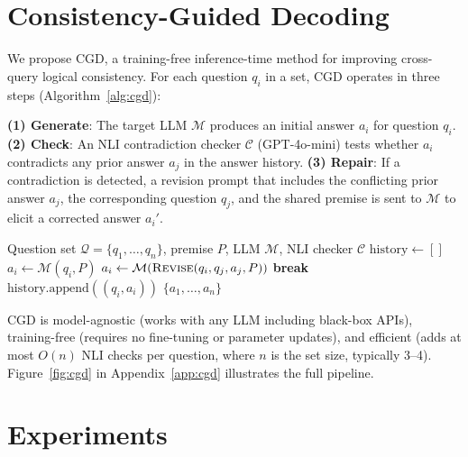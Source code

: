 \documentclass{article}
\newcommand{\method}{\textsc{CGD}}
\begin{document}
\section{Consistency-Guided Decoding}
\label{sec:method}

We propose \method{}, a training-free inference-time method for improving cross-query logical consistency. For each question $q_i$ in a set, \method{} operates in three steps (Algorithm~\ref{alg:cgd}):

\textbf{(1) Generate}: The target LLM $\mathcal{M}$ produces an initial answer $a_i$ for question $q_i$.
\textbf{(2) Check}: An NLI contradiction checker $\mathcal{C}$ (GPT-4o-mini) tests whether $a_i$ contradicts any prior answer $a_j$ in the answer history.
\textbf{(3) Repair}: If a contradiction is detected, a revision prompt that includes the conflicting prior answer $a_j$, the corresponding question $q_j$, and the shared premise is sent to $\mathcal{M}$ to elicit a corrected answer $a_i'$.

\begin{algorithm}[t]
\caption{Consistency-Guided Decoding (\method{})}
\label{alg:cgd}
\begin{algorithmic}[1]
\REQUIRE Question set $\mathcal{Q} = \{q_1, \ldots, q_n\}$, premise $P$, LLM $\mathcal{M}$, NLI checker $\mathcal{C}$
\STATE $\text{history} \leftarrow []$
    \STATE $a_i \leftarrow \mathcal{M}(q_i, P)$ \hfill {}
            \STATE $a_i \leftarrow \mathcal{M}(\textsc{Revise}(q_i, q_j, a_j, P))$ \hfill {}
            \STATE \textbf{break}
        \ENDIF
    \ENDFOR
    \STATE $\text{history}.\text{append}((q_i, a_i))$
\ENDFOR
\RETURN $\{a_1, \ldots, a_n\}$
\end{algorithmic}
\end{algorithm}

\method{} is model-agnostic (works with any LLM including black-box APIs), training-free (requires no fine-tuning or parameter updates), and efficient (adds at most $O(n)$ NLI checks per question, where $n$ is the set size, typically 3--4). Figure~\ref{fig:cgd} in Appendix~\ref{app:cgd} illustrates the full pipeline.

\section{Experiments}
\label{sec:experiments}
\end{document}
